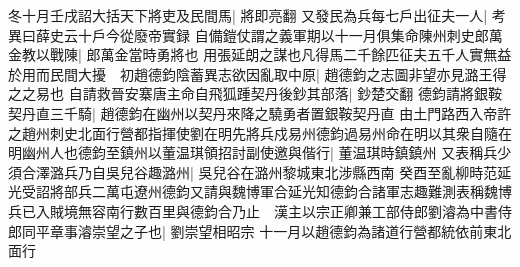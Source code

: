 冬十月壬戌詔大括天下將吏及民間馬|{
	將即亮翻}
又發民為兵每七戶出征夫一人|{
	考異曰薛史云十戶今從廢帝實録}
自備鎧仗謂之義軍期以十一月俱集命陳州刺史郎萬金教以戰陳|{
	郎萬金當時勇將也}
用張延朗之謀也凡得馬二千餘匹征夫五千人實無益於用而民間大擾　初趙德鈞陰蓄異志欲因亂取中原|{
	趙德鈞之志圖非望亦見潞王得之之易也}
自請救晉安寨唐主命自飛狐踵契丹後鈔其部落|{
	鈔楚交翻}
德鈞請將銀鞍契丹直三千騎|{
	趙德鈞在幽州以契丹來降之驍勇者置銀鞍契丹直}
由土門路西入帝許之趙州刺史北面行營都指揮使劉在明先將兵戍易州德鈞過易州命在明以其衆自隨在明幽州人也德鈞至鎮州以董温琪領招討副使邀與偕行|{
	董温琪時鎮鎮州}
又表稱兵少須合澤潞兵乃自吳兒谷趣潞州|{
	吳兒谷在潞州黎城東北涉縣西南}
癸酉至亂柳時范延光受詔將部兵二萬屯遼州德鈞又請與魏博軍合延光知德鈞合諸軍志趣難測表稱魏博兵已入賊境無容南行數百里與德鈞合乃止　漢主以宗正卿兼工部侍郎劉濬為中書侍郎同平章事濬崇望之子也|{
	劉崇望相昭宗}
十一月以趙德鈞為諸道行營都統依前東北面行

